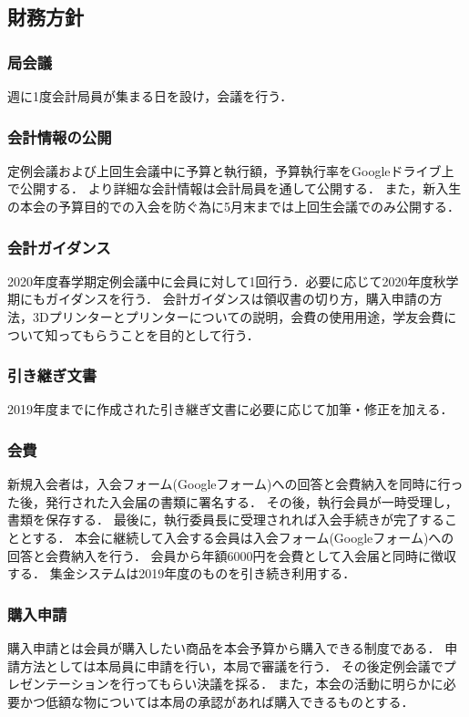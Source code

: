 \subsection*{財務方針}


\subsubsection*{局会議}
週に1度会計局員が集まる日を設け，会議を行う．

\subsubsection*{会計情報の公開}
定例会議および上回生会議中に予算と執行額，予算執行率をGoogleドライブ上で公開する．
より詳細な会計情報は会計局員を通して公開する．
また，新入生の本会の予算目的での入会を防ぐ為に5月末までは上回生会議でのみ公開する．

\subsubsection*{会計ガイダンス}
2020年度春学期定例会議中に会員に対して1回行う．必要に応じて2020年度秋学期にもガイダンスを行う．
会計ガイダンスは領収書の切り方，購入申請の方法，3Dプリンターとプリンターについての説明，会費の使用用途，学友会費について知ってもらうことを目的として行う．

\subsubsection*{引き継ぎ文書}
2019年度までに作成された引き継ぎ文書に必要に応じて加筆・修正を加える．

\subsubsection*{会費}
新規入会者は，入会フォーム(Googleフォーム)への回答と会費納入を同時に行った後，発行された入会届の書類に署名する．
その後，執行会員が一時受理し，書類を保存する．
最後に，執行委員長に受理されれば入会手続きが完了することとする．
本会に継続して入会する会員は入会フォーム(Googleフォーム)への回答と会費納入を行う．
会員から年額6000円を会費として入会届と同時に徴収する．
集金システムは2019年度のものを引き続き利用する．

\subsubsection*{購入申請}
購入申請とは会員が購入したい商品を本会予算から購入できる制度である．
申請方法としては本局員に申請を行い，本局で審議を行う．
その後定例会議でプレゼンテーションを行ってもらい決議を採る．
また，本会の活動に明らかに必要かつ低額な物については本局の承認があれば購入できるものとする．

